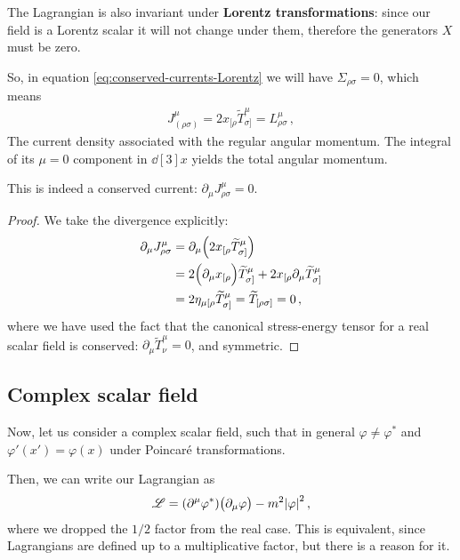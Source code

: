 \documentclass[main.tex]{subfiles}
\begin{document}
The Lagrangian is also invariant under \textbf{Lorentz transformations}: 
since our field is a Lorentz scalar it will not change under them, therefore the generators \(X\) must be zero. 

So, in equation \eqref{eq:conserved-currents-Lorentz} we will have \(\Sigma_{\rho \sigma } = 0\), which means 
%
\begin{align}
J^{\mu }_{(\rho \sigma )} = 2 x_{[\rho } \widetilde{T}^{\mu }_{\sigma ]} = L^{\mu }_{\rho \sigma }
\,,
\end{align}
%
The current density associated with the regular angular momentum. 
The integral of its \(\mu = 0\) component in \(\dd[3]{x}\) yields the total angular momentum. 

\begin{claim}
This is indeed a conserved current: \(\partial_{\mu } J^{\mu }_{\rho \sigma } = 0\). 
\end{claim}

\begin{proof}
We take the divergence explicitly: 
%
\begin{align}
\partial_{\mu } J^{\mu }_{\rho \sigma } &= \partial_{\mu } \qty(2 x_{[\rho } \widetilde{T}^{\mu }_{\sigma ]})  \\
&= 2 \qty(\partial_{\mu } x_{[\rho } ) \widetilde{T}^{\mu }_{\sigma ]}
+ 2 x_{[\rho } \partial_{\mu } \widetilde{T}^{\mu }_{\sigma ]}   \\
&= 2 \eta_{\mu [\rho } \widetilde{T}^{\mu }_{\sigma ]} = \widetilde{T}_{[\rho \sigma ]} = 0 
\,,
\end{align}
%
where we have used the fact that the canonical stress-energy tensor for a real scalar field is conserved: \(\partial_{\mu } \widetilde{T}^{\mu }_{\nu } = 0\), and symmetric. 
\end{proof}

\subsection{Complex scalar field}

Now, let us consider a complex scalar field, such that in general \(\varphi \neq \varphi^{*}\) and \(\varphi ' (x') = \varphi (x)\) under Poincaré transformations.

Then, we can write our Lagrangian as 
%
\begin{align}
\mathscr{L} = \qty(\partial^{\mu } \varphi^{*}) \qty(\partial_{\mu } \varphi )
- m^2 \abs{\varphi }^2
\,,
\end{align}
%
where we dropped the \(1/2\) factor from the real case. 
This is equivalent, since Lagrangians are defined up to a multiplicative factor, but there is a reason for it. 
\end{document}

